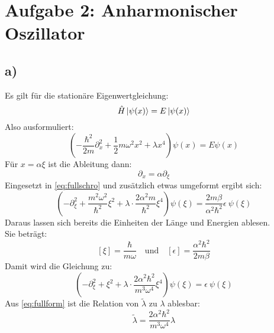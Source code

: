 \newpage
\section{Aufgabe 2: Anharmonischer Oszillator}
\label{sec:auf2}

\subsection{a)}
Es gilt für die stationäre Eigenwertgleichung:
\begin{equation}
    \hat{H} \ket{\psi(x)} = E \ket{\psi(x)}
\end{equation}
Also ausformuliert:
\begin{equation}
    \left(-\frac{\hbar^2}{2m}\partial^2_x + \frac{1}{2}m\omega^2x^2 + \lambda x^4\right)\psi(x) = E\psi(x)
    \label{eq:fullschro}
\end{equation}
Für $x = \alpha\xi$ ist die Ableitung dann:
\begin{equation}
    \partial_x = \alpha \partial_{\xi}
\end{equation}
Eingesetzt in \autoref{eq:fullschro} und zusätzlich etwas umgeformt ergibt sich:
\begin{equation}
    \left(-\partial_{\xi}^2 + \frac{m^2\omega^2}{\hbar^2}\xi^2 + \lambda\cdot \frac{2\alpha^2m}{\hbar^2} \xi^4\right) \psi(\xi) = \frac{2m\beta}{\alpha^2\hbar^2}\epsilon\ \psi(\xi)
    \label{eq:halfform}
\end{equation}
Daraus lassen sich bereits die Einheiten der Länge und Energien ablesen.\\
Sie beträgt:
\begin{equation}
    \left[\xi\right] = \frac{\hbar}{m\omega} \quad\text{und}\quad \left[\epsilon\right] = \frac{\alpha^2\hbar^2}{2m\beta}
\end{equation}
Damit wird die Gleichung zu:
\begin{equation}
    \left(-\partial_{\xi}^2 + \xi^2 + \lambda\cdot \frac{2\alpha^2\hbar^2}{m^3\omega^4} \xi^4\right) \psi(\xi) = \epsilon\ \psi(\xi)
    \label{eq:fullform}
\end{equation}
Aus \autoref{eq:fullform} ist die Relation von $\tilde{\lambda}$ zu $\lambda$ ablesbar:
\begin{equation}
    \tilde{\lambda} = \frac{2\alpha^2\hbar^2}{m^3\omega^4}\lambda
\end{equation}